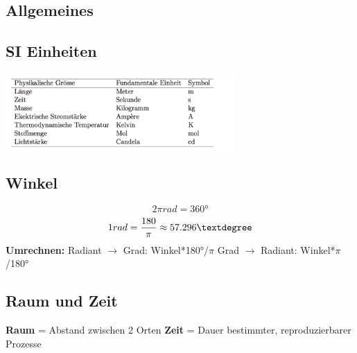 \documentclass[7pt]{article}
\begin{document}
\begin{multicols}{3}

\section{Allgemeines}


\subsection{SI Einheiten}

\begin{center}
	\includegraphics[width=250pt]{images/si_einheiten}
\end{center}



\subsection{Winkel}

\begin{equation}
	2\pi rad = 360°
\end{equation}
\begin{equation}
	1 \space rad = \frac{180}{\pi} \approx 57.296°
\end{equation}
\textbf {Umrechnen:}
\newline Radiant $\rightarrow$ Grad: Winkel*180°/$\pi$ 
\newline Grad $\rightarrow$ Radiant: Winkel*$\pi$/180°



\subsection{Raum und Zeit}

\textbf{Raum} = Abstand zwischen 2 Orten
\newline \textbf{Zeit} = Dauer bestimmter, reproduzierbarer Prozesse

\end{multicols}
\end{document}
